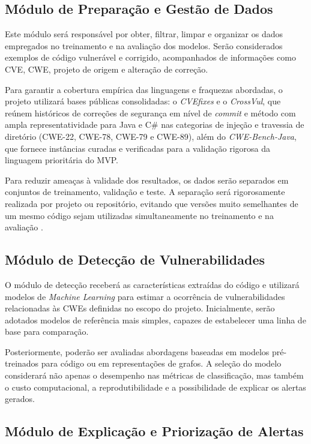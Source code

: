 \subsection{Módulo de Preparação e Gestão de Dados}

Este módulo será responsável por obter, filtrar, limpar e organizar os
dados empregados no treinamento e na avaliação dos modelos. Serão
considerados exemplos de código vulnerável e corrigido, acompanhados de
informações como CVE, CWE, projeto de origem e alteração de correção.

Para garantir a cobertura empírica das linguagens e fraquezas abordadas, o projeto utilizará bases públicas consolidadas: o \textit{CVEfixes} e o \textit{CrossVul}, que reúnem históricos de correções de segurança em nível de \textit{commit} e método com ampla representatividade para Java e C\# nas categorias de injeção e travessia de diretório (CWE-22, CWE-78, CWE-79 e CWE-89), além do \textit{CWE-Bench-Java}, que fornece instâncias curadas e verificadas para a validação rigorosa da linguagem prioritária do MVP.

Para reduzir ameaças à validade dos resultados, os dados serão separados
em conjuntos de treinamento, validação e teste. A separação será rigorosamente realizada por projeto ou repositório, evitando que versões
muito semelhantes de um mesmo código sejam utilizadas simultaneamente no
treinamento e na avaliação \cite{ding2024primevul}.

\subsection{Módulo de Detecção de Vulnerabilidades}

O módulo de detecção receberá as características extraídas do código e
utilizará modelos de \textit{Machine Learning} para estimar a ocorrência de
vulnerabilidades relacionadas às CWEs definidas no escopo do projeto.
Inicialmente, serão adotados modelos de referência mais simples, capazes de
estabelecer uma linha de base para comparação.

Posteriormente, poderão ser avaliadas abordagens baseadas em modelos
pré-treinados para código ou em representações de grafos. A seleção do
modelo considerará não apenas o desempenho nas métricas de classificação,
mas também o custo computacional, a reprodutibilidade e a possibilidade de
explicar os alertas gerados.

\subsection{Módulo de Explicação e Priorização de Alertas}

